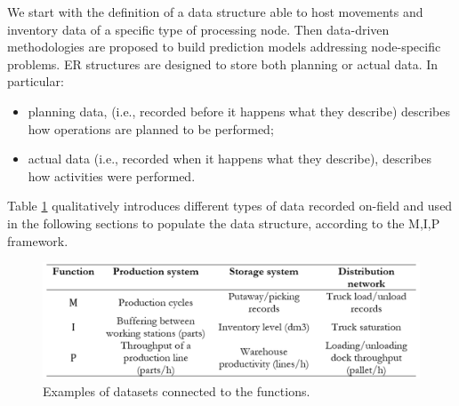 We start with the definition of a data structure able to host movements and inventory data of a specific type of processing node. Then data-driven methodologies are proposed to build prediction models addressing node-specific problems. ER structures are designed to store both planning or actual data. In particular:

\begin{itemize}
    \item planning data, (i.e., recorded before it happens what they describe) describes how operations are planned to be performed;
    \item actual data (i.e., recorded when it happens what they describe), describes how activities were performed.
\end{itemize}

Table \ref{tab_MIPinLS} qualitatively introduces different types of data recorded on-field and used in the following sections to populate the data structure, according to the M,I,P framework.

\begin{figure}[hbt!]
\centering
\includegraphics[width=1\textwidth]{SectionIntroduction/informationFramework_figures/tab_MIPinLS.png}
\captionsetup{type=table}
\caption{Examples of datasets connected to the functions.}
\label{tab_MIPinLS}
\end{figure}

\clearpage



